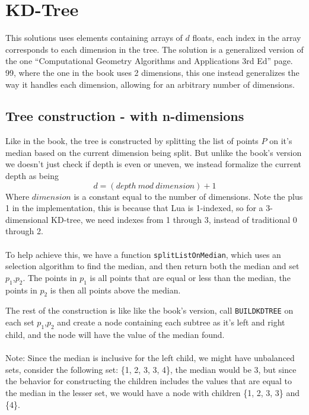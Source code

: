 \documentclass{article}
\begin{document}
\section{KD-Tree}
This solutions uses elements containing arrays of $d$ floats, each index in the array corresponds to each dimension in the tree.
The solution is a generalized version of the one ``Computational Geometry Algorithms and Applications 3rd Ed'' page. 99, where the one in the book uses 2 dimensions, this one instead
generalizes the way it handles each dimension, allowing for an arbitrary number of dimensions.
\subsection{Tree construction - with n-dimensions}
Like in the book, the tree is constructed by splitting the list of points $P$ on it's median based on the current dimension being split.
But unlike the book's version we doesn't just check if depth is even or uneven, we instead formalize the current depth as being
\[
 d = (depth\ mod\ dimension)+1
\]
Where $dimension$ is a constant equal to the number of dimensions.
Note the plus 1 in the implementation, this is because that Lua is 1-indexed, so for a 3-dimensional KD-tree, we need indexes from 1 through 3,
instead of traditional 0 through 2.\\
 \\
To help achieve this, we have a function \texttt{splitListOnMedian}, which uses an selection algorithm to find the median, and then return both the median and set $p_1$,$p_2$.
The points in $p_1$ is all points that are equal or less than the median, the points in $p_2$ is then all points above the median.

The rest of the construction is like like the book's version, call \texttt{BUILDKDTREE} on each set $p_1$,$p_2$ and create a node containing each subtree as it's left and right child, 
and the node will have the value of the median found.\\
 \\
Note: Since the median is inclusive for the left child, we might have unbalanced sets, consider the following set: \{1, 2, 3, 3, 4\}, the median would be 3, but since the behavior for
constructing the children includes the values that are equal to the median in the lesser set, we would have a node with children \{1, 2, 3, 3\} and \{4\}.
\end{document}
